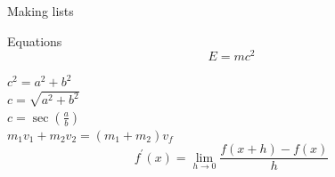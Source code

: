 \documentclass{article}
\begin{document}
\begin{section}{Making lists}
\begin{subsection}{Equations}
    \begin{equation}
      E = m c^2
    \end{equation}

    $ c^2 = a^2 + b^2$ \\
    $ c = \sqrt{a^2 + b^2}$ \\
    $ c = \sec(\frac{a}{b})$ \\

    $m_1 v_1 + m_2 v_2 = (m_1 + m_2) v_f$ \\

    $$ f^{'}(x) = \lim_{h \to 0} \frac{ f( x + h ) - f( x ) }{h}$$
  \end{subsection}

\end{section}

\end{document}
